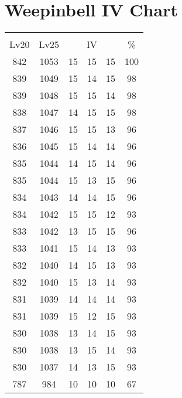 \documentclass{article}%
\begin{document}
%
\normalsize%
\section{Weepinbell IV Chart}%
\label{sec:Weepinbell IV Chart}%
\renewcommand{\arraystretch}{1.5}%
\begin{tabular}{|c|c|c|c|c|c|}%
\hline%
\multicolumn{6}{|c|}{\textcolor{white}{ 
\linebreak{Weepinbell}
}%
\cellcolor{black}}\\%
\multicolumn{1}{|c}{Lv20}&\multicolumn{1}{c|}{Lv25}&\multicolumn{3}{c|}{IV}&\multicolumn{1}{|c|}{\%}\\%
\hline%
\rowcolor{color100}%
842&1053&15&15&15&100\\%
\hline%
\rowcolor{color98}%
839&1049&15&14&15&98\\%
\hline%
\rowcolor{color98}%
839&1048&15&15&14&98\\%
\hline%
\rowcolor{color98}%
838&1047&14&15&15&98\\%
\hline%
\rowcolor{color96}%
837&1046&15&15&13&96\\%
\hline%
\rowcolor{color96}%
836&1045&15&14&14&96\\%
\hline%
\rowcolor{color96}%
835&1044&14&15&14&96\\%
\hline%
\rowcolor{color96}%
835&1044&15&13&15&96\\%
\hline%
\rowcolor{color96}%
834&1043&14&14&15&96\\%
\hline%
\rowcolor{color93}%
834&1042&15&15&12&93\\%
\hline%
\rowcolor{color96}%
833&1042&13&15&15&96\\%
\hline%
\rowcolor{color93}%
833&1041&15&14&13&93\\%
\hline%
\rowcolor{color93}%
832&1040&14&15&13&93\\%
\hline%
\rowcolor{color93}%
832&1040&15&13&14&93\\%
\hline%
\rowcolor{color93}%
831&1039&14&14&14&93\\%
\hline%
\rowcolor{color93}%
831&1039&15&12&15&93\\%
\hline%
\rowcolor{color93}%
830&1038&13&14&15&93\\%
\hline%
\rowcolor{color93}%
830&1038&13&15&14&93\\%
\hline%
\rowcolor{color93}%
830&1037&14&13&15&93\\%
\hline%
\rowcolor{color91}%
787&984&10&10&10&67\\%
\end{tabular}

%
\end{document}
